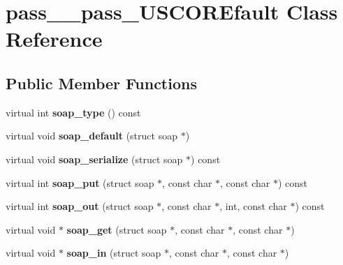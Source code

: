\hypertarget{classpass____pass__USCOREfault}{
\section{pass\_\-\_\-pass\_\-USCOREfault Class Reference}
\label{classpass____pass__USCOREfault}
}
\subsection*{Public Member Functions}
\begin{DoxyCompactItemize}
\item 
\hypertarget{classpass____pass__USCOREfault_a029142cfdba15d42ab56b4b264217839}{
virtual int {\bfseries soap\_\-type} () const }
\label{classpass____pass__USCOREfault_a029142cfdba15d42ab56b4b264217839}

\item 
\hypertarget{classpass____pass__USCOREfault_a5628509dbd1eb6f7056837b6308b66dd}{
virtual void {\bfseries soap\_\-default} (struct soap $\ast$)}
\label{classpass____pass__USCOREfault_a5628509dbd1eb6f7056837b6308b66dd}

\item 
\hypertarget{classpass____pass__USCOREfault_afca12eb06bd49c902e6f6a2018ab561c}{
virtual void {\bfseries soap\_\-serialize} (struct soap $\ast$) const }
\label{classpass____pass__USCOREfault_afca12eb06bd49c902e6f6a2018ab561c}

\item 
\hypertarget{classpass____pass__USCOREfault_afb244307d3ba4cda4c31468dc477c5c0}{
virtual int {\bfseries soap\_\-put} (struct soap $\ast$, const char $\ast$, const char $\ast$) const }
\label{classpass____pass__USCOREfault_afb244307d3ba4cda4c31468dc477c5c0}

\item 
\hypertarget{classpass____pass__USCOREfault_a674dc25a841d74d22bfacf104d6e538d}{
virtual int {\bfseries soap\_\-out} (struct soap $\ast$, const char $\ast$, int, const char $\ast$) const }
\label{classpass____pass__USCOREfault_a674dc25a841d74d22bfacf104d6e538d}

\item 
\hypertarget{classpass____pass__USCOREfault_a5b681e0ad062a736dc1f694c913edaae}{
virtual void $\ast$ {\bfseries soap\_\-get} (struct soap $\ast$, const char $\ast$, const char $\ast$)}
\label{classpass____pass__USCOREfault_a5b681e0ad062a736dc1f694c913edaae}

\item 
\hypertarget{classpass____pass__USCOREfault_acd7d7e05d77cdcf592979e4ba1002b3c}{
virtual void $\ast$ {\bfseries soap\_\-in} (struct soap $\ast$, const char $\ast$, const char $\ast$)}
\label{classpass____pass__USCOREfault_acd7d7e05d77cdcf592979e4ba1002b3c}

\end{DoxyCompactItemize}
